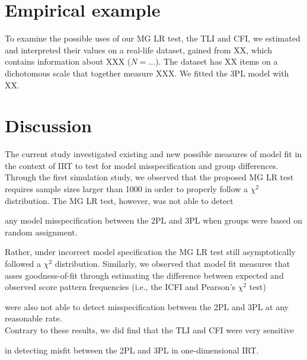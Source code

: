 \documentclass[Royal,sageapa,times,doublespace]{sagej}
\begin{document}
\newpage

\section{Empirical example}
To examine the possible uses of our MG LR test, the TLI and CFI, we estimated and interpreted their values on a real-life dataset, gained from XX, which contains information about XXX ($N = ...$). The dataset has XX items on a dichotomous scale that together measure XXX. We fitted the 3PL model with XX.

\section{Discussion}

The current study investigated existing and new possible measures of model fit in the context of IRT to test for model misspecification and group differences. Through the first simulation study, we observed that the proposed MG LR test requires sample sizes larger than 1000 in order to properly follow a $\chi^2$ distribution. The MG LR test, however, was not able to detect 

any model misspecification between the 2PL and 3PL when groups were based on random assignment. %

Rather, under incorrect model specification the MG LR test still asymptotically followed a $\chi^2$ distribution. Similarly, we observed that model fit measures that asses goodness-of-fit through estimating the difference between expected and observed score pattern frequencies (i.e., the ICFI and Pearson's $\chi^2$ test) 

were also not able to detect misspecification between the 2PL and 3PL at any reasonable rate. \\ %
\indent Contrary to these results, we did find that the TLI and CFI were very sensitive 

in detecting misfit between the 2PL and 3PL in one-dimensional IRT. %
\end{document}
